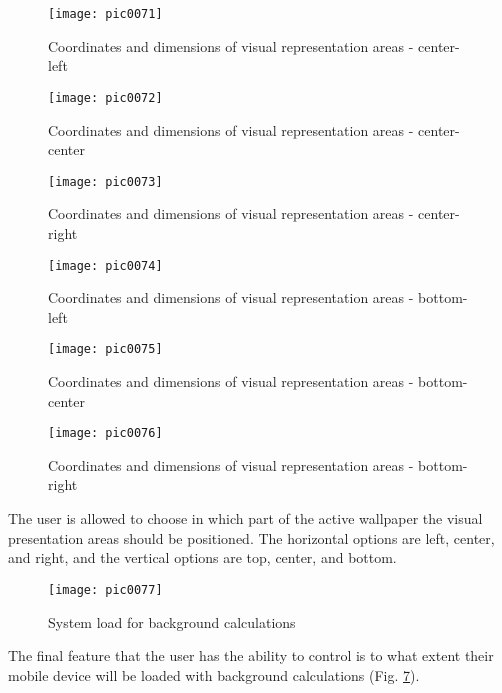 \begin{figure}[h]
\centering
\texttt{[image: pic0071]}
\caption{Coordinates and dimensions of visual representation areas - center-left}
\label{fig:pic0071}
\end{figure}
\FloatBarrier

\begin{figure}[h]
\centering
\texttt{[image: pic0072]}
\caption{Coordinates and dimensions of visual representation areas - center-center}
\label{fig:pic0072}
\end{figure}
\FloatBarrier

\begin{figure}[h]
\centering
\texttt{[image: pic0073]}
\caption{Coordinates and dimensions of visual representation areas - center-right}
\label{fig:pic0073}
\end{figure}
\FloatBarrier

\begin{figure}[h]
\centering
\texttt{[image: pic0074]}
\caption{Coordinates and dimensions of visual representation areas - bottom-left}
\label{fig:pic0074}
\end{figure}
\FloatBarrier

\begin{figure}[h]
\centering
\texttt{[image: pic0075]}
\caption{Coordinates and dimensions of visual representation areas - bottom-center}
\label{fig:pic0075}
\end{figure}
\FloatBarrier

\begin{figure}[h]
\centering
\texttt{[image: pic0076]}
\caption{Coordinates and dimensions of visual representation areas - bottom-right}
\label{fig:pic0076}
\end{figure}
\FloatBarrier

The user is allowed to choose in which part of the active wallpaper the visual presentation areas should be positioned. The horizontal options are left, center, and right, and the vertical options are top, center, and bottom.

\begin{figure}[h]
\centering
\texttt{[image: pic0077]}
\caption{System load for background calculations}
\label{fig:pic0077}
\end{figure}
\FloatBarrier

The final feature that the user has the ability to control is to what extent their mobile device will be loaded with background calculations (Fig. \ref{fig:pic0077}).

